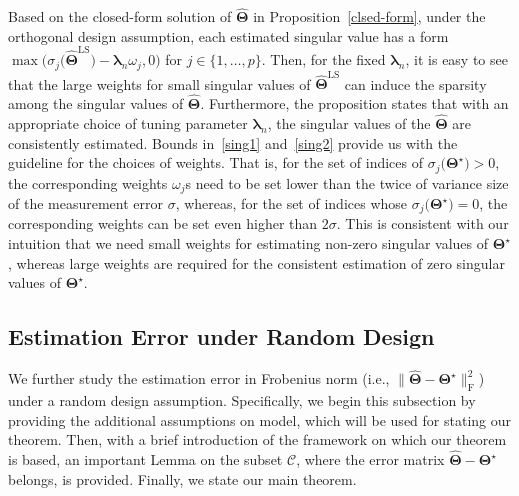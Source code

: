 \documentclass[alpha-refs]{wiley-article}
\begin{document}
Based on the closed-form solution of $\widehat{\boldsymbol{\Theta}}$ in Proposition~\ref{clsed-form}, under the orthogonal design assumption, each estimated singular value has a form $\max \big( \sigma_{j}\big(\widehat{\boldsymbol{\Theta}}^{\text{LS}}\big)-\boldsymbol{\lambda}_{n} \omega_{j},0 \big)$ for $j\in\{1,\dots,p\}$.
Then, for the fixed $\boldsymbol{\lambda}_{n}$, it is easy to see that the large weights for small singular values of $\widehat{\boldsymbol{\Theta}}^{\text{LS}}$ can induce the sparsity among the singular values of $\widehat{\boldsymbol{\Theta}}$.
Furthermore, the proposition states that with an appropriate choice of tuning parameter $\boldsymbol{\lambda}_{n}$, the singular values of the $\widehat{\boldsymbol{\Theta}}$ are consistently estimated.
Bounds in~\eqref{sing1} and~\eqref{sing2} provide us with the guideline for the choices of weights.
That is, for the set of indices of $\sigma_{j}\big(\boldsymbol{\Theta}^{\star}\big)>0$, the corresponding weights $\omega_{j}$s need to be set lower than the twice of variance size of the measurement error $\sigma$, whereas, for the set of indices whose $\sigma_{j}\big(\boldsymbol{\Theta}^{\star}\big)=0$, the corresponding weights can be set even higher than $2\sigma$.
This is consistent with our intuition that we need small weights for estimating non-zero singular values of $\boldsymbol{\Theta}^{\star}$, whereas large weights are required for the consistent estimation of zero singular values of $\boldsymbol{\Theta}^{\star}$.

\subsection{Estimation Error under Random Design}
We further study the estimation error in Frobenius norm (i.e., $\| \widehat{\boldsymbol{\Theta}} - \boldsymbol{\Theta^{\star}} \|_{\text{F}}^{2}$)  under a random design assumption.
Specifically, we begin this subsection by providing the additional assumptions on model, which will be used for stating our theorem.
Then, with a brief introduction of the framework on which our theorem is based, an important Lemma on the subset $\mathcal{C}$, where the error matrix $\widehat{\boldsymbol{\Theta}}-\boldsymbol{\Theta^{\star}}$ belongs, is provided.
Finally, we state our main theorem.
\end{document}
